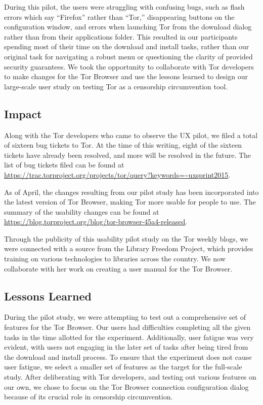\documentclass[letterpaper,twocolumn,11pt]{article}
\begin{document}
During this pilot, the users were struggling with confusing bugs, such as flash errors which
say ``Firefox'' rather than ``Tor,'' disappearing buttons on the configuration window, and errors when
launching Tor from the download dialog rather than from their applications folder. This resulted in our 
participants spending most of their time on the download and install tasks, rather than 
our original task for navigating a robust menu or questioning the clarity of provided security 
guarantees. We took the opportunity to collaborate with Tor developers to make changes for the Tor 
Browser and use the lessons learned to design our large-scale user study on testing Tor as a 
censorship circumvention tool. 

\subsection{Impact}
\indent \indent Along with the Tor developers who came to observe the UX pilot, we filed 
a total of sixteen bug tickets to Tor. At the time of  this writing, eight of the sixteen tickets 
have already been resolved, and more will be resolved in the future.  The list of bug
tickets filed can be found at \url{https://trac.torproject.org/projects/tor/query?keywords=~uxsprint2015}. 

As of April, the changes resulting from our pilot study has been incorporated into the latest 
version of Tor Browser, making Tor more usable for people to use. 
The summary of the usability changes can be found at \url{https://blog.torproject.org/blog/tor-browser-45a4-released}. 

Through the publicity of this usability pilot study on the Tor weekly blogs, we were connected
with a source from the Library Freedom Project, which provides training on various technologies 
to libraries across the country. We now collaborate with her work on creating a user manual
for the Tor Browser. 

\subsection{Lessons Learned} 
\indent \indent During the pilot study, we were attempting to test out a comprehensive set of 
features for the Tor Browser. Our users had difficulties completing all the given tasks in the 
time allotted for the experiment. Additionally, user fatigue was very evident, with users not 
engaging in the later set of tasks after being tired from the download and install process. 
To ensure that the experiment does not cause user fatigue, we select a smaller set of features 
as the target for the full-scale study.  After deliberating with Tor developers, and testing out
various features on our own, we chose to focus on the Tor Browser connection configuration 
dialog because of its crucial role in censorship circumvention. 
\end{document}

